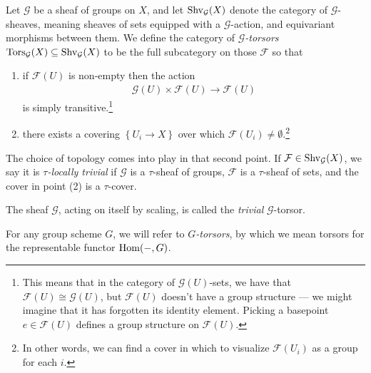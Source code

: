 \documentclass[11pt,openany]{book}
\begin{document}
\begin{definition}\label{def:torsor} 
\cite[03AH]{Stacks} Let $\mathcal{G}$ be a sheaf of groups on $X$, and let $\mathrm{Shv}_\mathcal{G}(X)$ denote the category of $\mathcal{G}$-sheaves, meaning sheaves of sets equipped with a $\mathcal{G}$-action, and equivariant morphisms between them. We define the category of $\mathcal{G}$\textit{-torsors} $\mathrm{Tors}_\mathcal{G}(X) \subseteq \mathrm{Shv}_\mathcal{G}(X)$ to be the full subcategory on those $\mathcal{F}$ so that
\begin{enumerate}
    \item if $\mathcal{F}(U)$ is non-empty then the action
    \begin{align*}
        \mathcal{G}(U) \times \mathcal{F}(U) \to \mathcal{F}(U)
    \end{align*}
    is simply transitive.\footnote{This means that in the category of $\mathcal{G}(U)$-sets, we have that $\mathcal{F}(U) \cong \mathcal{G}(U)$, but $\mathcal{F}(U)$ doesn't have a group structure --- we might imagine that it has forgotten its identity element. Picking a basepoint $e\in \mathcal{F}(U)$ defines a group structure on $\mathcal{F}(U)$.} 
    
    \item there exists a covering $\left\{ U_i \to X \right\}$ over which $\mathcal{F}(U_i) \ne \emptyset$.\footnote{In other words, we can find a cover in which to visualize $\mathcal{F}(U_i)$ as a group for each $i$.}
\end{enumerate}
\end{definition}

\begin{terminology} The choice of topology comes into play in that second point. If $\mathcal{F} \in \mathrm{Shv}_{\mathcal{G}}(X)$, we say it is $\tau$\textit{-locally trivial} if $\mathcal{G}$ is a $\tau$-sheaf of groups, $\mathcal{F}$ is a $\tau$-sheaf of sets, and the cover in point (2) is a $\tau$-cover.
\end{terminology}


\begin{example} The sheaf $\mathcal{G}$, acting on itself by scaling, is called the \textit{trivial} $\mathcal{G}$-torsor.
\end{example}

\begin{example} For any group scheme $G$, we will refer to $G$\textit{-torsors}, by which we mean torsors for the representable functor $\mathrm{Hom}(-,G)$.
\end{example}
\end{document}
